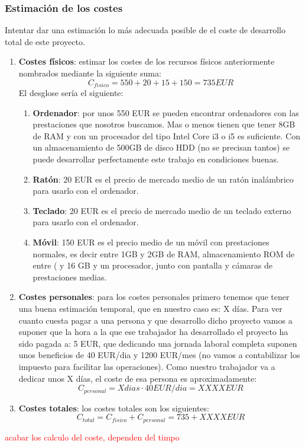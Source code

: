 \subsubsection{Estimación de los costes}

Intentar dar una estimación lo más adecuada posible de el coste de desarrollo total de este proyecto.
\begin{enumerate}
\item \textbf{Costes físicos}: estimar los costes de los recursos físicos anteriormente nombrados mediante la siguiente suma: 
$$ C_{fisico} = 550 + 20 + 15 + 150 = 735 EUR$$
El desglose sería el siguiente: 
\begin{enumerate}
\item \textbf{Ordenador}: por unos 550 EUR se pueden encontrar ordenadores con las prestaciones que nosotros buscamos. Mas o menos tienen que tener 8GB de RAM y con un procesador del tipo Intel Core i3 o i5 es suficiente. Con un almacenamiento de 500GB de disco HDD (no se precisan tantos) se puede desarrollar perfectamente este trabajo en condiciones buenas. 
\item \textbf{Ratón}: 20 EUR es el precio de mercado medio de un ratón inalámbrico para usarlo con el ordenador.
\item \textbf{Teclado}: 20 EUR es el precio de mercado medio de un teclado externo para usarlo con el ordenador.
\item \textbf{Móvil}: 150 EUR es el precio medio de un móvil con prestaciones normales, es decir entre 1GB y 2GB de RAM, almacenamiento ROM de entre ( y 16 GB y un procesador, junto con pantalla y cámaras de prestaciones medias. 
\end{enumerate}

\item \textbf{Costes personales}: para los costes personales primero tenemos que tener una buena estimación temporal, que en nuestro caso es: X días. Para ver cuanto cuesta pagar a una persona y que desarrollo dicho proyecto vamos a suponer que la hora a la que ese trabajador ha desarrollado el proyecto ha sido pagada a: 5 EUR, que dedicando una jornada laboral completa suponen unos beneficios de 40 EUR/dia y 1200 EUR/mes (no vamos a contabilizar los impuesto para facilitar las operaciones). Como nuestro trabajador va a dedicar unos X días, el coste de esa persona es aproximadamente: 
$$ C_{personal} = X dias \cdot 40 EUR/dia = XXXX EUR$$

\item \textbf{Costes totales}: los costes totales son los siguientes: 
$$ C_{total} = C_{fisico} + C_{personal} = 735 + XXXX EUR$$
\end{enumerate}

\textcolor{red}{acabar los calculo del coste, dependen del timpo}
